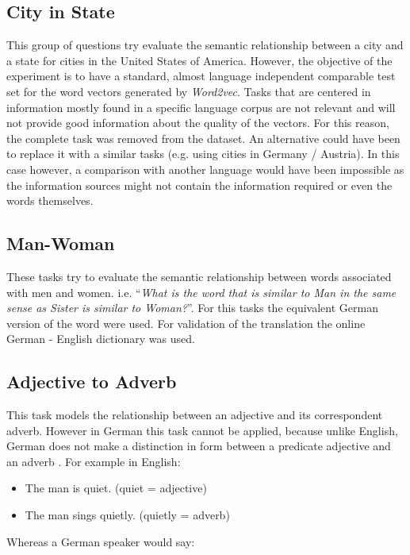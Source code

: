 \subsection{City in State}
\label{sec:sub_sec_city_in_state}
This group of questions try evaluate the semantic relationship between a city
and a state for cities in the United States of America.  However, the
objective of the experiment is to have a standard,  almost
language independent comparable test set for the word vectors generated by
\textit{Word2vec}. Tasks that are centered in information mostly found in a
specific language corpus  are not relevant and
will not provide good information about the quality of the vectors. For this
reason, the complete task  was removed from the dataset. An alternative could
have been to replace it with a similar tasks (e.g. using cities in Germany / Austria). In this case however, a
comparison with another language would have been impossible as the
information sources might not contain the  information required or even the
words themselves.

\subsection{Man-Woman}
\label{sec:sub_sec_man_woman}
These tasks try to evaluate the semantic relationship between words associated
with men and women. i.e. ``\emph{What is the word that is similar to
Man in the same sense as Sister is similar to Woman?}''. For this tasks
the equivalent German version of the word were used. For validation of the
translation the online German - English
dictionary was used.

\subsection{Adjective to Adverb}
\label{sec:sub_sec_adjetive_adverb}
This task models the relationship between an adjective and its correspondent
adverb.   However in German this task cannot be applied,  because unlike English,
German does not make a distinction in form between a predicate adjective and
an adverb \cite{durrell2011hammer}. For example in English:

\begin{itemize}
\item The man is quiet. (quiet = adjective)
\item The man sings quietly. (quietly = adverb)
\end{itemize}

Whereas a German speaker would say:

